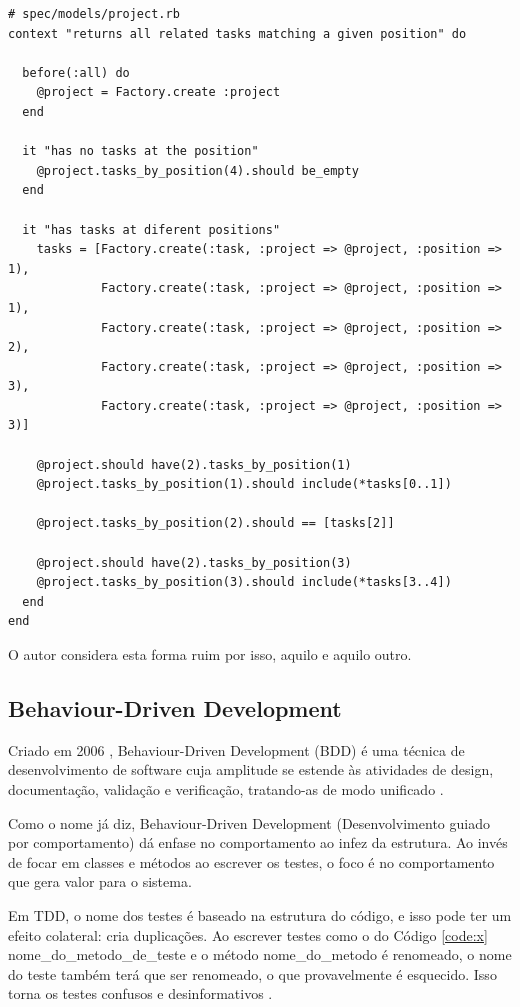 \begin{lstlisting}[caption=Teste do método Project\#tasks\_by\_position escrito de uma outra forma,label=code:tdd_spec_outra_forma]
# spec/models/project.rb
context "returns all related tasks matching a given position" do

  before(:all) do
    @project = Factory.create :project
  end

  it "has no tasks at the position"
    @project.tasks_by_position(4).should be_empty
  end

  it "has tasks at diferent positions"
    tasks = [Factory.create(:task, :project => @project, :position => 1),
             Factory.create(:task, :project => @project, :position => 1),
             Factory.create(:task, :project => @project, :position => 2),
             Factory.create(:task, :project => @project, :position => 3),
             Factory.create(:task, :project => @project, :position => 3)]

    @project.should have(2).tasks_by_position(1)
    @project.tasks_by_position(1).should include(*tasks[0..1])

    @project.tasks_by_position(2).should == [tasks[2]]

    @project.should have(2).tasks_by_position(3)
    @project.tasks_by_position(3).should include(*tasks[3..4])
  end
end
\end{lstlisting}

O autor considera esta forma ruim por isso, aquilo e aquilo outro.


\subsection{Behaviour-Driven Development}

Criado em 2006 \cite{IntroducingBDD}, Behaviour-Driven Development (BDD) é uma técnica de desenvolvimento de software cuja amplitude se estende às atividades de design, documentação, validação e verificação, tratando-as de modo unificado \cite{BDDRodrigo}.

Como o nome já diz, Behaviour-Driven Development (Desenvolvimento guiado por comportamento) dá enfase no comportamento ao infez da estrutura. Ao invés de focar em classes e métodos ao escrever os testes, o foco é no comportamento que gera valor para o sistema.

Em TDD, o nome dos testes é baseado na estrutura do código, e isso pode ter um efeito colateral: cria duplicações. Ao escrever testes como o do Código \ref{code:x} nome\_do\_metodo\_de\_teste e o método nome\_do\_metodo é renomeado, o nome do teste também terá que ser renomeado, o que provavelmente é esquecido. Isso torna os testes confusos e desinformativos \cite{ContinuousTesting}.

